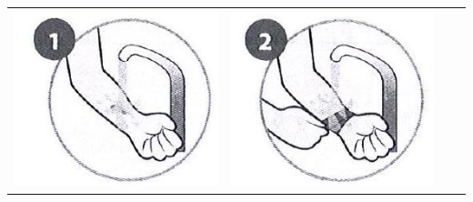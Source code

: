 \documentclass[10pt]{article}
\begin{document}
\begin{center}
\begin{tabular}{|l|l|l|l|}
\hline
\includegraphics[max width=\textwidth]{2025_10_23_adad5b98d65ac6665838g-10(1)}
 & \includegraphics[max width=\textwidth]{2025_10_23_adad5b98d65ac6665838g-10(3)}

\end{tabular}
\end{center}
\end{document}
